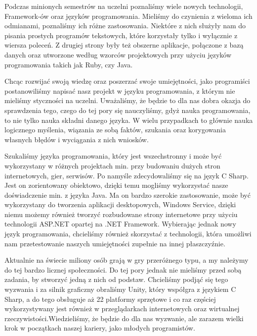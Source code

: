 \documentclass[openright]{xmgr}
\begin{document}
\maketitle

\introduction

  Podczas minionych semestrów na uczelni poznaliśmy wiele nowych technologii, Framework-ów oraz języków programowania. Mieliśmy do czynienia z wieloma ich odmianami, poznaliśmy ich różne zastosowania. Niektóre z nich służyły nam do pisania prostych programów tekstowych, które korzystały tylko i wyłącznie z wiersza poleceń. Z drugiej strony były też obszerne aplikacje, połączone z bazą danych oraz utworzone według wzorców projektowych przy użyciu  języków programowania takich jak Ruby, czy Java. 

  Chcąc rozwijać swoją wiedzę oraz poszerzać swoje umiejętności, jako programiści postanowiliśmy napisać nasz projekt w języku programowania, z którym nie mieliśmy styczności na uczelni. Uważaliśmy, że będzie to dla nas dobra okazja do sprawdzenia tego, czego do tej pory się nauczyliśmy, gdyż nauka programowania, to nie tylko nauka składni danego języka. W wielu przypadkach to głównie nauka logicznego myślenia, wiązania ze sobą faktów, szukania oraz korygowania własnych błędów i wyciągania z nich wniosków. 

  Szukaliśmy języka programowania, który jest wszechstronny i może być wykorzystany w różnych projektach min. przy budowaniu dużych stron internetowych, gier, serwisów. Po namyśle zdecydowaliśmy się na język C Sharp. Jest on zorientowany obiektowo, dzięki temu mogliśmy wykorzystać nasze doświadczenie min. z języka Java.  Ma on bardzo szerokie zastosowanie, może być wykorzystany do tworzenia aplikacji desktopowych, Windows Service, dzięki niemu możemy również tworzyć rozbudowane strony internetowe przy użyciu technologii ASP.NET opartej na .NET Framework. Wybierając jednak nowy język programowania, chcieliśmy również skorzystać z technologii, która umożliwi nam przetestowanie naszych umiejętności zupełnie na innej płaszczyźnie.

  Aktualnie na świecie miliony osób grają w gry przeróżnego typu, a my należymy do tej bardzo licznej społeczności. Do tej pory jednak nie mieliśmy przed sobą zadania, by stworzyć jedną z nich od podstaw. Chcieliśmy podjąć się tego wyzwania i za silnik graficzny obraliśmy Unity, który współgra z językiem C Sharp, a do tego obsługuje aż 22 platformy sprzętowe i co raz częściej wykorzystywany jest również w przeglądarkach internetowych oraz wirtualnej rzeczywistości.Wiedzieliśmy, że będzie do dla nas wyzwanie, ale zarazem wielki krok w początkach naszej kariery, jako młodych programistów.
\end{document}
